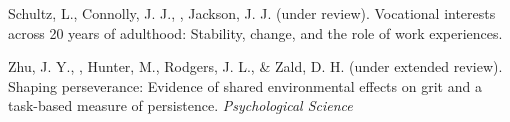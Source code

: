 \begin{etaremune}
\item Schultz, L., Connolly, J. J., \meb, Jackson, J. J. (under review). Vocational interests across 20 years of adulthood: Stability, change, and the role of work experiences. %
\item Zhu, J. Y., \meb, Hunter, M., Rodgers, J. L., \& Zald, D. H. (under extended review). Shaping perseverance: Evidence of shared environmental effects on grit and a task-based measure of persistence. \textit{Psychological Science}
\end{etaremune}